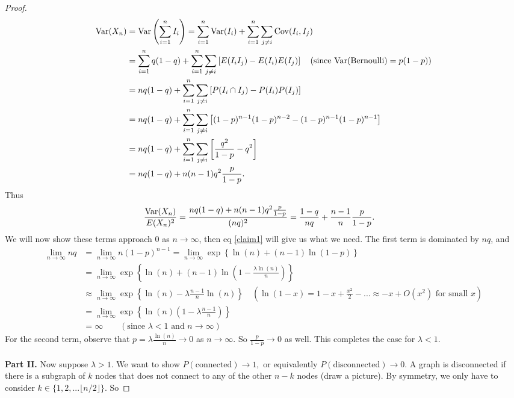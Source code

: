 \documentclass[./some_latex_template.tex]{subfiles}
\begin{document}
\begin{proof}
\begin{align*}
	\mathop{\rm Var}\nolimits(X_n) 
	&= \mathop{\rm Var}\nolimits\left(\sum_{i=1}^nI_i\right) = \sum_{i=1}^n\mathop{\rm Var}\nolimits(I_i) + \sum_{i=1}^n\sum_{j\neq i} \mathop{\rm Cov}\nolimits(I_i, I_j)\\
	&= \sum_{i=1}^n q(1-q) + \sum_{i=1}^n \sum_{j\neq i}\left[ E(I_iI_j) - E(I_i)E(I_j) \right] \quad (\text{since Var(Bernoulli)} = p(1-p))\\
	&= nq(1-q) + \sum_{i=1}^n \sum_{j\neq i}\left[ P(I_i \cap I_j) - P(I_i)P(I_j) \right]\\
	&= nq(1-q) + \sum_{i=1}^n\sum_{j\neq i}\left[ (1-p)^{n-1}(1-p)^{n-2} - (1-p)^{n-1}(1-p)^{n-1} \right]\\
	&= nq(1-q) + \sum_{i=1}^n\sum_{j\neq i}\left[ \frac{q^2}{1-p} - q^2 \right]\\
	&= nq(1-q) + n(n-1)q^2\frac{p}{1-p}.
\end{align*}
Thus 
\begin{align*}
	\frac{\mathop{\rm Var}\nolimits(X_n)}{E(X_n)^2} 
	&= \frac{nq(1-q) + n(n-1)q^2\frac{p}{1-p}}{(nq)^2} = \frac{1-q}{nq} + \frac{n-1}{n}\frac{p}{1-p}.
\end{align*}
We will now show these terms approach 0 as $n \rightarrow \infty$, then eq \eqref{claim1} will give us what we need.
The first term is dominated by $nq$, and
\begin{align*}
	\lim_{n \rightarrow \infty} nq 
	&= \lim_{n \rightarrow \infty} n(1-p)^{n-1} = \lim_{n \rightarrow \infty}  \exp \left\{ \ln(n) + (n-1)\ln(1 - p) \right\}\\
	&= \lim_{n \rightarrow \infty} \exp \left\{ \ln(n) + (n-1)\ln\left( 1 - \frac{\lambda \ln(n)}{n} \right) \right\}\\
	&\approx \lim_{n \rightarrow \infty} \exp \left\{ \ln(n) - \lambda\frac{n-1}{n}\ln(n) \right\} \quad (\ln(1 - x) = 1 - x + \frac{x^2}{2}- ... \approx -x + O(x^2) \text{ for small }x)\\
	&= \lim_{n \rightarrow \infty} \exp \left\{ \ln(n)\left( 1 - \lambda\frac{n-1}{n} \right) \right\}\\
	&= \infty \qquad \left(\text{since } \lambda < 1 \text{ and } n \rightarrow \infty \right)
\end{align*}
For the second term, observe that $p = \lambda \frac{\ln(n)}{n} \rightarrow 0$ as $n \rightarrow \infty$. So $\frac{p}{1-p} \rightarrow 0$ as well. This completes the case for $\lambda < 1$. \\
\\
\textbf{Part II.} Now suppose $\lambda > 1$. We want to show $P(\text{connected})\rightarrow 1,$ or equivalently $P(\text{disconnected})\rightarrow 0$. A graph is disconnected if there is a subgraph of $k$ nodes that does not connect to any of the other $n - k$ nodes (draw a picture). By symmetry, we only have to consider $k \in \{1, 2, ... \lfloor n/2 \rfloor\}$.  So 

\end{proof}
\end{document}

